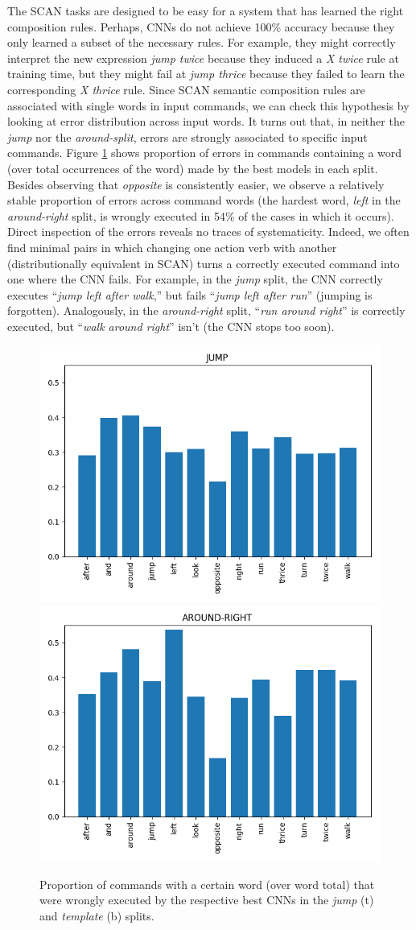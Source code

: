 The SCAN tasks are designed to be easy for a system that has learned
the right composition rules. Perhaps, CNNs do not achieve 100\%
accuracy because they only learned a subset of the necessary
rules. For example, they might correctly interpret the new
expression \emph{jump twice} because they induced a \emph{X twice}
rule at training time, but they might fail at \emph{jump
  thrice} because they failed to learn the corresponding \emph{X
  thrice} rule. Since SCAN semantic composition rules are associated
with single words in input commands, we can check this hypothesis by
looking at error distribution across input words. It turns out that,
in neither the \emph{jump} nor the \emph{around-split}, errors are
strongly associated to specific input commands. Figure
\ref{fig:error_distributions} shows proportion of errors in commands
containing a word (over total occurrences of the word) made by the
best models in each split. Besides observing that \emph{opposite} is
consistently easier, we observe a relatively stable proportion of
errors across command words (the hardest word, \emph{left} in the
\emph{around-right} split, is wrongly executed in 54\% of the cases in
which it occurs). Direct inspection of the errors reveals no traces of
systematicity. Indeed, we often find minimal pairs in which changing
one action verb with another (distributionally equivalent in SCAN)
turns a correctly executed command into one where the CNN fails. For
example, in the \emph{jump} split, the CNN correctly executes
``\emph{jump left after walk},'' but fails ``\emph{jump left after
  run}'' (jumping is forgotten). Analogously, in the
\emph{around-right} split, ``\emph{run around right}'' is correctly
executed, but ``\emph{walk around right}'' isn't (the CNN stops too
soon).

\begin{figure}[tb]
    \centering
    \includegraphics[width=.4\textwidth,keepaspectratio]{figures/jump_error_dist.png}
    \includegraphics[width=.4\textwidth,keepaspectratio]{figures/template_error_dist.png}
    \caption{Proportion of commands with a certain word (over word
      total) that were wrongly executed by the respective best CNNs in
      the \emph{jump} (t) and \emph{template} (b) splits.}
    \label{fig:error_distributions}
\end{figure}

